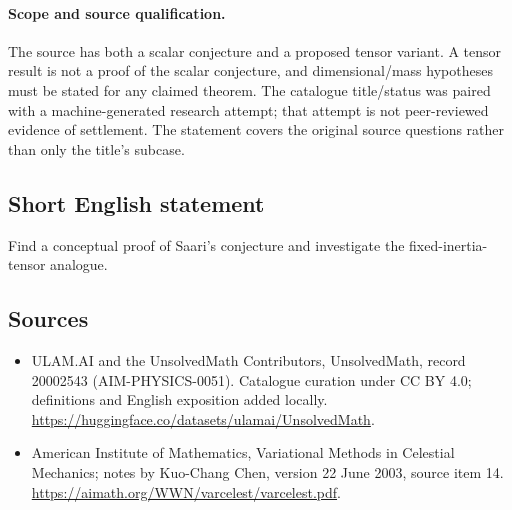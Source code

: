 \documentclass[11pt]{article}
\begin{document}
\paragraph{Scope and source qualification.}The source has both a scalar conjecture and a proposed tensor variant. A tensor result is not a proof of the scalar conjecture, and dimensional/mass hypotheses must be stated for any claimed theorem. The catalogue title/status was paired with a machine-generated research attempt; that attempt is not peer-reviewed evidence of settlement. The statement covers the original source questions rather than only the title’s subcase.
\subsection{Short English statement}
Find a conceptual proof of Saari’s conjecture and investigate the fixed-inertia-tensor analogue.
\subsection{Sources}
\begin{itemize}
\item[\hypertarget{source:20002543:1}{S1}] ULAM.AI and the UnsolvedMath Contributors, UnsolvedMath, record 20002543 (AIM-PHYSICS-0051). Catalogue curation under CC BY 4.0; definitions and English exposition added locally.
\url{https://huggingface.co/datasets/ulamai/UnsolvedMath}.
\item[\hypertarget{source:20002543:2}{S2}] American Institute of Mathematics, Variational Methods in Celestial Mechanics; notes by Kuo-Chang Chen, version 22 June 2003, source item 14.
\url{https://aimath.org/WWN/varcelest/varcelest.pdf}.
\end{itemize}
\label{end:20002543}
\end{document}
